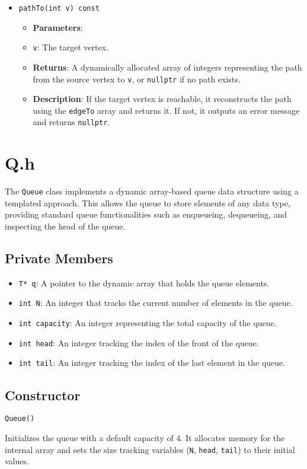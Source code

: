 \documentclass{article}
\begin{document}
\begin{itemize}
    \item \texttt{pathTo(int v) const}
    \begin{itemize}
        \item \textbf{Parameters}:
        \item \texttt{v}: The target vertex.
        \item \textbf{Returns}: A dynamically allocated array of integers representing the path from the source vertex to \texttt{v}, or \texttt{nullptr} if no path exists.
        \item \textbf{Description}: If the target vertex is reachable, it reconstructs the path using the \texttt{edgeTo} array and returns it. If not, it outputs an error message and returns \texttt{nullptr}.
    \end{itemize}
\end{itemize}

\section{Q.h}
The \texttt{Queue} class implements a dynamic array-based queue data structure using a templated approach. This allows the queue to store elements of any data type, providing standard queue functionalities such as enqueueing, dequeueing, and inspecting the head of the queue.

\subsection{Private Members}
\begin{itemize}
    \item \texttt{T* q}: A pointer to the dynamic array that holds the queue elements.
    \item \texttt{int N}: An integer that tracks the current number of elements in the queue.
    \item \texttt{int capacity}: An integer representing the total capacity of the queue.
    \item \texttt{int head}: An integer tracking the index of the front of the queue.
    \item \texttt{int tail}: An integer tracking the index of the last element in the queue.
\end{itemize}

\subsection{Constructor}
\begin{verbatim}
Queue()
\end{verbatim}
Initializes the queue with a default capacity of 4. It allocates memory for the internal array and sets the size tracking variables (\texttt{N}, \texttt{head}, \texttt{tail}) to their initial values.
\end{document}

